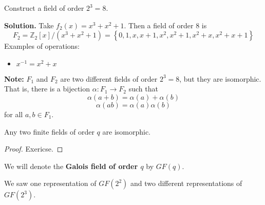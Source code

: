 \begin{exbox}
    \begin{example}
    Construct a field of order $ 2^3=8 $.

    \textbf{Solution.} Take $ f_2(x)=x^3+x^2+1 $. Then a field of order $ 8 $ is
    \[ F_2=\mathbb{Z}_2[x]/(x^3+x^2+1)=\left\{ 0,1,x,x+1,x^2,x^2+1,x^2+x,x^2+x+1\right\} \]
    Examples of operations:
    \begin{itemize}
        \item $ x^{-1}=x^2+x $
    \end{itemize}
\end{example}
\end{exbox}

\textbf{Note:} $ F_1 $ and $ F_2 $ are two different fields of order $ 2^3=8 $,
but they are isomorphic. That is,
there is a bijection $ \alpha : F_1\rightarrow F_2 $ such that
\[ \alpha(a+b)=\alpha(a)+\alpha(b) \]
\[ \alpha(ab)=\alpha(a)\alpha(b) \]
for all $ a,b\in F_1 $.

\begin{thmbox}
    \begin{theorem}
        Any two finite fields of order $ q $ are isomorphic.
    \end{theorem}
\end{thmbox}

\begin{proof}
    Exericse.
\end{proof}

\begin{defbox}
    \begin{definition}
        We will denote the \textbf{Galois field of order $ q $} by $ GF(q) $.
    \end{definition}
\end{defbox}
We saw one representation of $ GF(2^2) $
and two different representations of $ GF(2^3) $.
